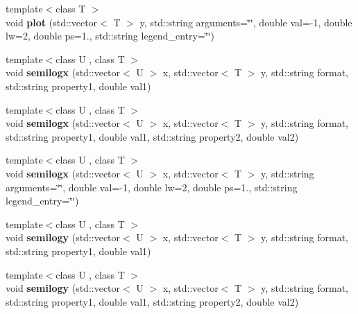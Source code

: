 \begin{DoxyCompactItemize}
\item 
\hypertarget{classkeycpp_1_1_figure_a3646790552f73645bf926b1678fede40}{{\footnotesize template$<$class T $>$ }\\void {\bfseries plot} (std\-::vector$<$ T $>$ y, std\-::string arguments=\char`\"{}\char`\"{}, double val=-\/1, double lw=2, double ps=1., std\-::string legend\-\_\-entry=\char`\"{}\char`\"{})}\label{classkeycpp_1_1_figure_a3646790552f73645bf926b1678fede40}

\item 
\hypertarget{classkeycpp_1_1_figure_aa92130b35ce5dd9bc52e1ed4bd85682c}{{\footnotesize template$<$class U , class T $>$ }\\void {\bfseries semilogx} (std\-::vector$<$ U $>$ x, std\-::vector$<$ T $>$ y, std\-::string format, std\-::string property1, double val1)}\label{classkeycpp_1_1_figure_aa92130b35ce5dd9bc52e1ed4bd85682c}

\item 
\hypertarget{classkeycpp_1_1_figure_a442655002324395b08e5511bbb02146a}{{\footnotesize template$<$class U , class T $>$ }\\void {\bfseries semilogx} (std\-::vector$<$ U $>$ x, std\-::vector$<$ T $>$ y, std\-::string format, std\-::string property1, double val1, std\-::string property2, double val2)}\label{classkeycpp_1_1_figure_a442655002324395b08e5511bbb02146a}

\item 
\hypertarget{classkeycpp_1_1_figure_a849fa48f8fb7d4ee9cb205a5310f2c23}{{\footnotesize template$<$class U , class T $>$ }\\void {\bfseries semilogx} (std\-::vector$<$ U $>$ x, std\-::vector$<$ T $>$ y, std\-::string arguments=\char`\"{}\char`\"{}, double val=-\/1, double lw=2, double ps=1., std\-::string legend\-\_\-entry=\char`\"{}\char`\"{})}\label{classkeycpp_1_1_figure_a849fa48f8fb7d4ee9cb205a5310f2c23}

\item 
\hypertarget{classkeycpp_1_1_figure_a8fa3aba0daf6f74bbb7c1d0553156b44}{{\footnotesize template$<$class U , class T $>$ }\\void {\bfseries semilogy} (std\-::vector$<$ U $>$ x, std\-::vector$<$ T $>$ y, std\-::string format, std\-::string property1, double val1)}\label{classkeycpp_1_1_figure_a8fa3aba0daf6f74bbb7c1d0553156b44}

\item 
\hypertarget{classkeycpp_1_1_figure_a15fbce90514b55af60d3819c8da2561f}{{\footnotesize template$<$class U , class T $>$ }\\void {\bfseries semilogy} (std\-::vector$<$ U $>$ x, std\-::vector$<$ T $>$ y, std\-::string format, std\-::string property1, double val1, std\-::string property2, double val2)}\label{classkeycpp_1_1_figure_a15fbce90514b55af60d3819c8da2561f}


\end{DoxyCompactItemize}
